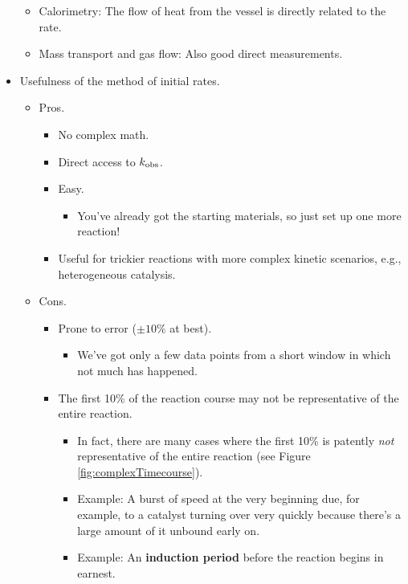 \documentclass[../notes.tex]{subfiles}
\begin{document}
\begin{itemize}
\begin{itemize}
        \item Calorimetry: The flow of heat from the vessel is directly related to the rate.
        \item Mass transport and gas flow: Also good direct measurements.
    \end{itemize}
    \item Usefulness of the method of initial rates.
    \begin{itemize}
        \item Pros.
        \begin{itemize}
            \item No complex math.
            \item Direct access to $k_\textup{obs}$.
            \item Easy.
            \begin{itemize}
                \item You've already got the starting materials, so just set up one more reaction!
            \end{itemize}
            \item Useful for trickier reactions with more complex kinetic scenarios, e.g., heterogeneous catalysis.
        \end{itemize}
        \item Cons.
        \begin{itemize}
            \item Prone to error ($\pm 10\%$ at best).
            \begin{itemize}
                \item We've got only a few data points from a short window in which not much has happened.
            \end{itemize}
            \item The first 10\% of the reaction course may not be representative of the entire reaction.
            \begin{itemize}
                \item In fact, there are many cases where the first 10\% is patently \emph{not} representative of the entire reaction (see Figure \ref{fig:complexTimecourse}).
                \item Example: A burst of speed at the very beginning due, for example, to a catalyst turning over very quickly because there's a large amount of it unbound early on.
                \item Example: An \textbf{induction period} before the reaction begins in earnest.
            \end{itemize}

\end{itemize}
\end{itemize}
\end{itemize}
\end{document}

